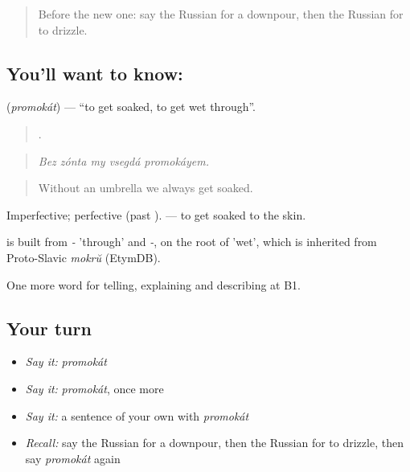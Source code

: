 \label{lesson:RU-C465-promokat}



\begin{quote}
Before the new one: say the Russian for a downpour, then the Russian for to drizzle.
\end{quote}

\subsection*{You'll want to know: }
\textbf{} (\emph{promokát}) — \textquotedblleft{}to get soaked, to get wet through\textquotedblright{}.

\begin{quote}
    .
\end{quote}

\begin{quote}
\emph{Bez zónta my vsegdá promokáyem.}
\end{quote}

\begin{quote}
Without an umbrella we always get soaked.
\end{quote}

Imperfective; perfective \emph{} (past \emph{}). \emph{  } — to get soaked to the skin.

\begin{cousinweb}
\emph{} is built from \emph{-} 'through' and \emph{-}, on the root of \emph{} 'wet', which is inherited from Proto-Slavic \emph{mokrŭ} (EtymDB).
\end{cousinweb}

\begin{grammarlens}[title={What you've built}]
One more word for telling, explaining and describing at B1.
\end{grammarlens}

\subsection*{Your turn}
\begin{itemize}
\raggedright
  \item \emph{Say it:} \emph{promokát}
  \item \emph{Say it:} \emph{promokát}, once more
  \item \emph{Say it:} a sentence of your own with \emph{promokát}
  \item \emph{Recall:} say the Russian for a downpour, then the Russian for to drizzle, then say \emph{promokát} again
\end{itemize}


